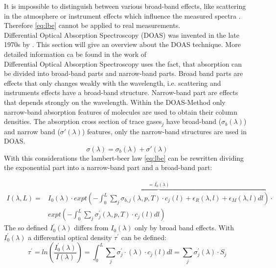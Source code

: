 \documentclass  [
  paper    = a4,
  BCOR     = 10mm,
  twoside,
  fontsize = 12pt,
  fleqn,
  toc      = bibnumbered,
  toc      = listofnumbered,
  numbers  = noendperiod,
  headings = normal,
  listof   = leveldown,
  version  = 3.03
]                                       {scrreprt}
\begin{document}
	It is impossible to distinguish between various broad-band effects, like scattering in the atmosphere or instrument effects which influence the measured spectra \cite{lubcke2014optical}. Therefore \cref{eq:lbe} cannot be applied to real measurements.\\
	Differential Optical Absorption Spectroscopy (DOAS) was invented in the late 1970s by \cite{perner1979detection}. This section will give an overview about the DOAS technique. More detailed information ca be found in the work of \cite{platt2008differential}\\
	\newline
	Differential Optical Absorption Spectroscopy uses the fact, that absorption can be divided into broad-band parts and narrow-band parts. Broad band parts are effects that only changes weakly with the wavelength,  i.e. scattering and instruments effects have a broad-band structure. 
	Narrow-band part are effects that depends strongly on the wavelength.
	Within the DOAS-Method only narrow-band absorption features of molecules are used to obtain their column densities.
	The absorption cross section of trace gases$_j$ have broad-band ($\sigma_b\left(\lambda \right)$) and narrow band ($\sigma{'}\left(\lambda \right)$) features, only the narrow-band structures are used in DOAS.
	\begin{equation}
	\sigma\left(\lambda \right) = \sigma_b\left(\lambda \right) + \sigma{'}\left(\lambda \right)
	\end{equation}
	With this considerations the lambert-beer law \cref{eq:lbe} can be rewritten
	dividing the exponential part into a narrow-band part and a broad-band part:

	\begin{align}
	I\left(\lambda,L\right) = &\overbrace{I_{0}\left(\lambda\right)\cdot expt\left(-\int^{L}_{0}\sum_{j}\sigma_{b,j}\left(\lambda,p,T\right)\cdot c_{j}\left(l\right)+\epsilon_R\left(\lambda,l\right)+\epsilon_{M}\left(\lambda,l\right)dl\right)}^{=I^{'}_0\left(\lambda\right)} \cdot \nonumber \\
	&expt\left(-\int^{L}_{0}\sum_{j}\sigma_{j}^{'}\left(\lambda,p,T\right)\cdot c_{j}\left(l\right)dl\right)
	\label{eq:bb}
	\end{align}	
	The so defined $I^{'}_0\left(\lambda\right)$ differs from $I_0\left(\lambda\right)$ only by broad band effects. With $I^{'}_0\left(\lambda\right)$ a differential optical density $\tau^{'}$ can be defined:
	\begin{equation}
	\tau^{'} = ln\left(\frac{I^{'}_0\left(\lambda\right)}{I\left(\lambda\right)}\right) = \int_{0}^{L} \sum_{j} \sigma^{'}_{j} \cdot \left(\lambda\right) \cdot c_{j}\left(l\right)dl = \sum_{j}\sigma^{'}_{j}\left(\lambda\right)\cdot S_{j}
	\label{eq:taustrich}
	\end{equation}
	
\end{document}
